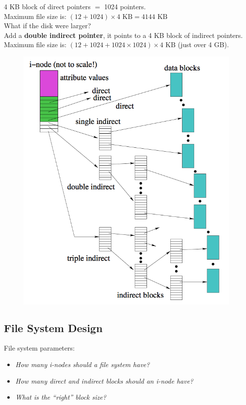 \documentclass[12pt]{article}
\theoremstyle{plain}
\theoremstyle{definition}
\begin{document}
4 KB block of direct pointers $=$ 1024 pointers. \\
Maximum file size is: $(12 + 1024) \times 4 \text{ KB} = 4144 \text{ KB}$ \\

What if the disk were larger? \\
Add a \textbf{double indirect pointer}, it points to a 4 KB block of indirect pointers. \\
Maximum file size is: $(12 + 1024 + 1024 \times 1024) \times 4 \text{ KB}$ (just over 4 GB).

\begin{figure}[H]
  \centering
  \includegraphics[scale=0.73]{pictures/i-node_diagram.png}
\end{figure}

\subsection{File System Design}
File system parameters:
\begin{itemize}
  \item \emph{How many i-nodes should a file system have?}
  \item \emph{How many direct and indirect blocks should an i-node have?}
  \item \emph{What is the ``right'' block size?}
\end{itemize}
\end{document}
